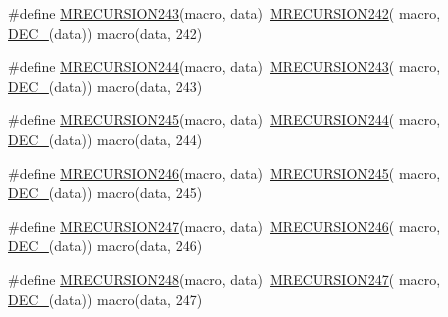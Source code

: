 \begin{DoxyCompactItemize}
\item 
\#define \mbox{\hyperlink{group__group__sam0__utils__mrecursion_gaa82beeebaab247b9ed2ac646cfe20f9c}{M\+R\+E\+C\+U\+R\+S\+I\+O\+N243}}(macro,  data)~\mbox{\hyperlink{group__group__sam0__utils__mrecursion_gac9925d3d1732bd7e47e61f7c9dfeafbd}{M\+R\+E\+C\+U\+R\+S\+I\+O\+N242}}(  macro, \mbox{\hyperlink{group__group__sam0__utils__mrecursion_ga1d23d683797679dca8c3512a54a5dcae}{D\+E\+C\+\_\+}}(data))   macro(data, 242)
\item 
\#define \mbox{\hyperlink{group__group__sam0__utils__mrecursion_gac3825130b40518fcd95815a474335cfa}{M\+R\+E\+C\+U\+R\+S\+I\+O\+N244}}(macro,  data)~\mbox{\hyperlink{group__group__sam0__utils__mrecursion_gaa82beeebaab247b9ed2ac646cfe20f9c}{M\+R\+E\+C\+U\+R\+S\+I\+O\+N243}}(  macro, \mbox{\hyperlink{group__group__sam0__utils__mrecursion_ga1d23d683797679dca8c3512a54a5dcae}{D\+E\+C\+\_\+}}(data))   macro(data, 243)
\item 
\#define \mbox{\hyperlink{group__group__sam0__utils__mrecursion_ga29389831061b5516c92aecda3fa98385}{M\+R\+E\+C\+U\+R\+S\+I\+O\+N245}}(macro,  data)~\mbox{\hyperlink{group__group__sam0__utils__mrecursion_gac3825130b40518fcd95815a474335cfa}{M\+R\+E\+C\+U\+R\+S\+I\+O\+N244}}(  macro, \mbox{\hyperlink{group__group__sam0__utils__mrecursion_ga1d23d683797679dca8c3512a54a5dcae}{D\+E\+C\+\_\+}}(data))   macro(data, 244)
\item 
\#define \mbox{\hyperlink{group__group__sam0__utils__mrecursion_ga25546469a624b95c6a35ac8afc6f8639}{M\+R\+E\+C\+U\+R\+S\+I\+O\+N246}}(macro,  data)~\mbox{\hyperlink{group__group__sam0__utils__mrecursion_ga29389831061b5516c92aecda3fa98385}{M\+R\+E\+C\+U\+R\+S\+I\+O\+N245}}(  macro, \mbox{\hyperlink{group__group__sam0__utils__mrecursion_ga1d23d683797679dca8c3512a54a5dcae}{D\+E\+C\+\_\+}}(data))   macro(data, 245)
\item 
\#define \mbox{\hyperlink{group__group__sam0__utils__mrecursion_gabf0b381254bd692cd7d2a3099bb3b9c0}{M\+R\+E\+C\+U\+R\+S\+I\+O\+N247}}(macro,  data)~\mbox{\hyperlink{group__group__sam0__utils__mrecursion_ga25546469a624b95c6a35ac8afc6f8639}{M\+R\+E\+C\+U\+R\+S\+I\+O\+N246}}(  macro, \mbox{\hyperlink{group__group__sam0__utils__mrecursion_ga1d23d683797679dca8c3512a54a5dcae}{D\+E\+C\+\_\+}}(data))   macro(data, 246)
\item 
\#define \mbox{\hyperlink{group__group__sam0__utils__mrecursion_ga769f51d1e1ee63f851004b0b7754e9c1}{M\+R\+E\+C\+U\+R\+S\+I\+O\+N248}}(macro,  data)~\mbox{\hyperlink{group__group__sam0__utils__mrecursion_gabf0b381254bd692cd7d2a3099bb3b9c0}{M\+R\+E\+C\+U\+R\+S\+I\+O\+N247}}(  macro, \mbox{\hyperlink{group__group__sam0__utils__mrecursion_ga1d23d683797679dca8c3512a54a5dcae}{D\+E\+C\+\_\+}}(data))   macro(data, 247)

\end{DoxyCompactItemize}
